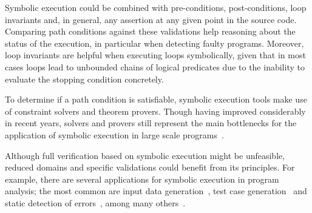Symbolic execution could be combined with pre-conditions, post-conditions, loop invariants and, in general, any assertion at any given point in the source code. Comparing path conditions against these validations help reasoning about the status of the execution, in particular when detecting faulty programs. Moreover, loop invariants are helpful when executing loops symbolically, given that in most cases loops lead to unbounded chains of logical predicates due to the inability to evaluate the stopping condition concretely.

To determine if a path condition is satisfiable, symbolic execution tools make use of constraint solvers and theorem provers. Though having improved considerably in recent years, solvers and provers still represent the main bottlenecks for the application of symbolic execution in large scale programs~\cite{Cadar2013}. 

Although full verification based on symbolic execution might be unfeasible, reduced domains and specific validations could benefit from its principles. For example, there are several applications for symbolic execution in program analysis; the most common are input data generation~\cite{Clarke1976}, test case generation~\cite{Cadar2008,Csallner,Godefroid2008,Visser2004a} and static detection of errors~\cite{Bush2000,Tomb2007}, among many others~\cite{Csallner2008,Siegel2006}.